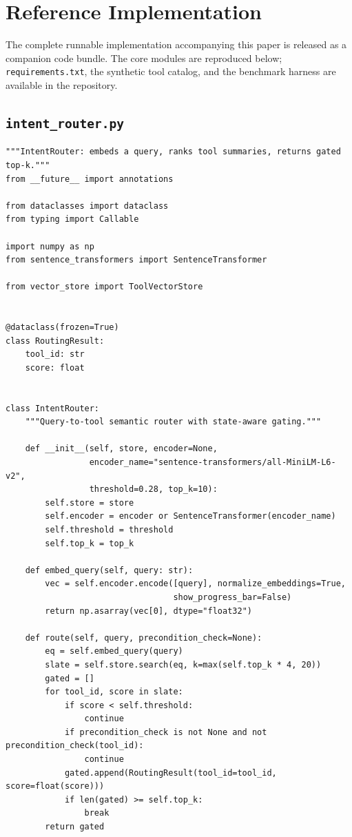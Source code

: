 \documentclass[11pt]{article}
\begin{document}



\appendix
\section{Reference Implementation}\label{app:code}

The complete runnable implementation accompanying this paper is released as a companion code bundle. The core modules are reproduced below; \texttt{requirements.txt}, the synthetic tool catalog, and the benchmark harness are available in the repository.

\subsection{\texttt{intent\_router.py}}
\begin{verbatim}
"""IntentRouter: embeds a query, ranks tool summaries, returns gated top-k."""
from __future__ import annotations

from dataclasses import dataclass
from typing import Callable

import numpy as np
from sentence_transformers import SentenceTransformer

from vector_store import ToolVectorStore


@dataclass(frozen=True)
class RoutingResult:
    tool_id: str
    score: float


class IntentRouter:
    """Query-to-tool semantic router with state-aware gating."""

    def __init__(self, store, encoder=None,
                 encoder_name="sentence-transformers/all-MiniLM-L6-v2",
                 threshold=0.28, top_k=10):
        self.store = store
        self.encoder = encoder or SentenceTransformer(encoder_name)
        self.threshold = threshold
        self.top_k = top_k

    def embed_query(self, query: str):
        vec = self.encoder.encode([query], normalize_embeddings=True,
                                  show_progress_bar=False)
        return np.asarray(vec[0], dtype="float32")

    def route(self, query, precondition_check=None):
        eq = self.embed_query(query)
        slate = self.store.search(eq, k=max(self.top_k * 4, 20))
        gated = []
        for tool_id, score in slate:
            if score < self.threshold:
                continue
            if precondition_check is not None and not precondition_check(tool_id):
                continue
            gated.append(RoutingResult(tool_id=tool_id, score=float(score)))
            if len(gated) >= self.top_k:
                break
        return gated
\end{verbatim}
\end{document}
